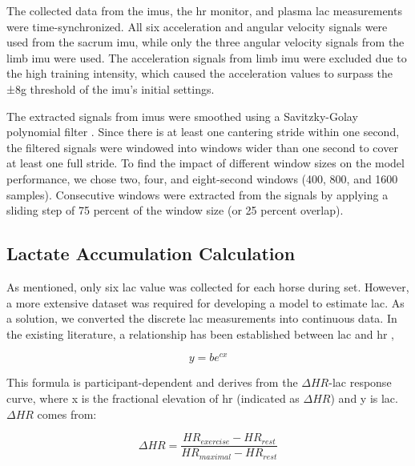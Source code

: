 The collected data from the \gls{imu}s, the \gls{hr} monitor, and plasma \gls{lac} measurements were time-synchronized. All six acceleration and angular velocity signals were used from the sacrum \gls{imu}, while only the three angular velocity signals from the limb \gls{imu} were used. The acceleration signals from limb \gls{imu} were excluded due to the high training intensity, which caused the acceleration values to surpass the ±8g threshold of the \gls{imu}'s initial settings.

The extracted signals from \gls{imu}s were smoothed using a Savitzky-Golay polynomial filter \cite{Karaim2019-gh}. Since there is at least one cantering stride within one second, the filtered signals were windowed into windows wider than one second to cover at least one full stride. To find the impact of different window sizes on the model performance, we chose two, four, and eight-second windows (400, 800, and 1600 samples). Consecutive windows were extracted from the signals by applying a sliding step of 75 percent of the window size (or 25 percent overlap). 

\subsection{Lactate Accumulation Calculation}
As mentioned, only six \gls{lac} value was collected for each horse during \gls{set}. However, a more extensive dataset was required for developing a model to estimate \gls{lac}. As a solution, we converted the discrete \gls{lac} measurements into continuous data. In the existing literature, a relationship has been established between \gls{lac} and \gls{hr} \cite{Munsters2020AStudy,Manzi2009-xy},

\begin{equation}y=be^{cx}\end{equation}

This formula is participant-dependent and derives from the $\Delta HR$-\gls{lac} response curve, where x is the fractional elevation of \gls{hr} (indicated as $\Delta HR$) and y is \gls{lac}. $\Delta HR$ comes from:

\begin{equation}\Delta HR=\dfrac{HR_{exercise}-HR_{rest}}{HR_{maximal}-HR_{rest}}\end{equation}

